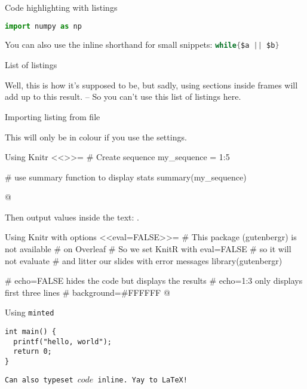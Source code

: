 \begin{frame}[fragile]{Code highlighting with listings}
\begin{lstlisting}[language=Python, caption={A demonstration}]
import numpy as np
\end{lstlisting}

You can also use the inline shorthand for small snippets: \lstinline[language=C]!while{$a || $b}!

\end{frame}

\begin{frame}{List of listings}
    
    Well, this is how it's supposed to be, but sadly, using sections inside frames will add up to this result. -- So you can't use this list of listings here.
\end{frame}



\begin{frame}[fragile]{Importing listing from file}
\lstset{style=myxml} %


This will only be in colour if you use the settings.
\end{frame}

\begin{frame}[fragile]{Using Knitr}
<<>>=
# Create sequence
my_sequence = 1:5
 
# use summary function to display stats
summary(my_sequence)
 
@

Then output values inside the text: .
\end{frame}

\begin{frame}[fragile]{Using Knitr with options}
<<eval=FALSE>>=
# This package (gutenbergr) is not available 
# on Overleaf
# So we set KnitR with eval=FALSE
# so it will not evaluate
# and litter our slides with error messages
library(gutenbergr)

# echo=FALSE hides the code but displays the results
# echo=1:3 only displays first three lines
# background=#FFFFFF
@

\end{frame}

\begin{frame}[fragile]{Using \texttt{minted}}
\begin{verbatim}
int main() {
  printf("hello, world");
  return 0;
}
\end{verbatim}
\texttt{Can also typeset $code$ inline. Yay to \LaTeX{}!}
\end{frame}

